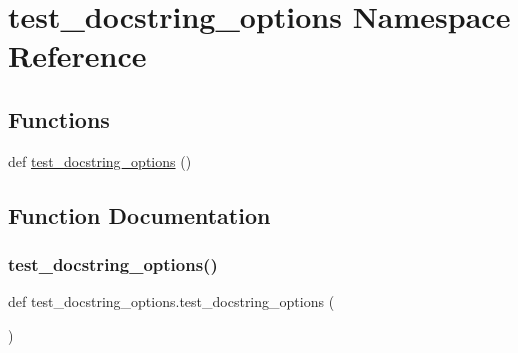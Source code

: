 \hypertarget{namespacetest__docstring__options}{}\section{test\+\_\+docstring\+\_\+options Namespace Reference}
\label{namespacetest__docstring__options}
\subsection*{Functions}
\begin{DoxyCompactItemize}
\item 
def \mbox{\hyperlink{namespacetest__docstring__options_a63c28e35836478d15810986e50f8d3e0}{test\+\_\+docstring\+\_\+options}} ()
\end{DoxyCompactItemize}


\subsection{Function Documentation}
\mbox{\label{namespacetest__docstring__options_a63c28e35836478d15810986e50f8d3e0}} 
\subsubsection{\texorpdfstring{test\_docstring\_options()}{test\_docstring\_options()}}
{\footnotesize\ttfamily def test\+\_\+docstring\+\_\+options.\+test\+\_\+docstring\+\_\+options (\begin{DoxyParamCaption}{ }\end{DoxyParamCaption})}

